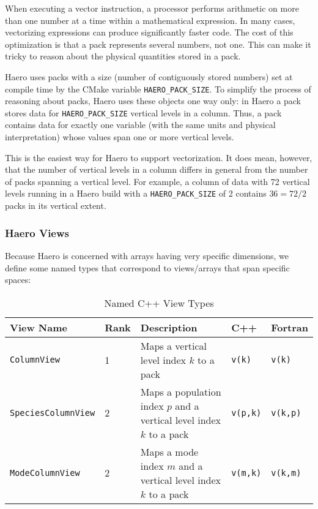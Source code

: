 When executing a vector instruction, a processor performs arithmetic on more
than one number at a time within a mathematical expression. In many cases,
vectorizing expressions can produce significantly faster code. The cost of this
optimization is that a pack represents several numbers, not one. This can make
it tricky to reason about the physical quantities stored in a pack.

Haero uses packs with a size (number of contiguously stored numbers) set at
compile time by the CMake variable \texttt{HAERO\_PACK\_SIZE}. To simplify the
process of reasoning about packs, Haero uses these objects one way only:
in Haero a pack stores data for \texttt{HAERO\_PACK\_SIZE} vertical levels in
a column. Thus, a pack contains data for exactly one variable (with the same
units and physical interpretation) whose values span one or more vertical
levels.

This is the easiest way for Haero to support vectorization. It does mean,
however, that the number of vertical levels in a column differs in general from
the number of packs spanning a vertical level. For example, a column of data
with 72 vertical levels running in a Haero build with a \texttt{HAERO\_PACK\_SIZE}
of 2 contains $36 = 72 / 2 $ packs in its vertical extent.

\subsubsection*{Haero Views}

Because Haero is concerned with arrays having very specific dimensions, we
define some named types that correspond to views/arrays that span specific
spaces:

\begin{table}[htbp]
\centering
\caption{Named C++ View Types}
\label{tab:viewtypes}
\begin{tabular}{|l|l|p{6cm}|l|l|}
  \toprule
  View Name & Rank & Description & C++ & Fortran \\
  \midrule
  \texttt{ColumnView} & 1 & Maps a vertical level index $k$ to a pack & \texttt{v(k)} & \texttt{v(k)} \\
  \texttt{SpeciesColumnView} & 2 & Maps a population index $p$ and a vertical level index $k$ to a pack & \texttt{v(p,k)}  & \texttt{v(k,p)} \\
  \texttt{ModeColumnView} & 2 & Maps a mode index $m$ and a vertical level index $k$ to a pack & \texttt{v(m,k)}  & \texttt{v(k,m)} \\
  \bottomrule
\end{tabular}
\end{table}


